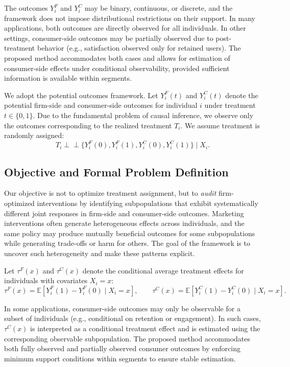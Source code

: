 \documentclass[11pt,letterpaper,english]{article}
\theoremstyle{definition}
\theoremstyle{definition}
\begin{document}
\begin{bibunit}
The outcomes $Y_i^F$ and $Y_i^C$ may be binary, continuous, or discrete, and the framework does not impose distributional restrictions on their support. In many applications, both outcomes are directly observed for all individuals. In other settings, consumer-side outcomes may be partially observed due to post-treatment behavior (e.g., satisfaction observed only for retained users). The proposed method accommodates both cases and allows for estimation of consumer-side effects under conditional observability, provided sufficient information is available within segments.

We adopt the potential outcomes framework. Let $Y_i^F(t)$ and $Y_i^C(t)$ denote the potential firm-side and consumer-side outcomes for individual $i$ under treatment $t \in \{0,1\}$. Due to the fundamental problem of causal inference, we observe only the outcomes corresponding to the realized treatment $T_i$. We assume treatment is randomly assigned:
\[
T_i \perp\!\!\!\perp \{Y_i^F(0), Y_i^F(1), Y_i^C(0), Y_i^C(1)\} \mid X_i.
\]

\subsection{Objective and Formal Problem Definition}
\label{ssec:setting}

Our objective is not to optimize treatment assignment, but to \emph{audit} firm-optimized interventions by identifying subpopulations that exhibit systematically different joint responses in firm-side and consumer-side outcomes. Marketing interventions often generate heterogeneous effects across individuals, and the same policy may produce mutually beneficial outcomes for some subpopulations while generating trade-offs or harm for others. The goal of the framework is to uncover such heterogeneity and make these patterns explicit.

Let $\tau^F(x)$ and $\tau^C(x)$ denote the conditional average treatment effects for individuals with covariates $X_i = x$:
\[
\tau^F(x) = \mathbb{E}[Y_i^F(1) - Y_i^F(0) \mid X_i = x], \qquad
\tau^C(x) = \mathbb{E}[Y_i^C(1) - Y_i^C(0) \mid X_i = x].
\]

In some applications, consumer-side outcomes may only be observable for a subset of individuals (e.g., conditional on retention or engagement). In such cases, $\tau^C(x)$ is interpreted as a conditional treatment effect and is estimated using the corresponding observable subpopulation. The proposed method accommodates both fully observed and partially observed consumer outcomes by enforcing minimum support conditions within segments to ensure stable estimation.


\end{bibunit}
\end{document}
